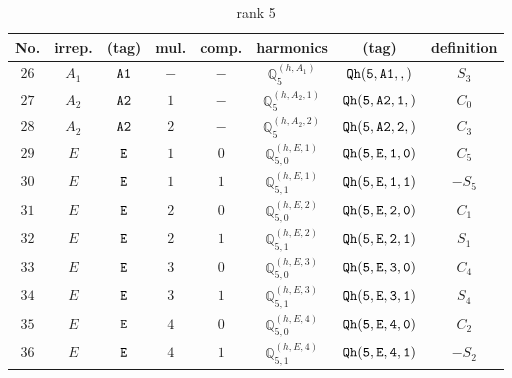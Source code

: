 \documentclass[fleqn,8pt]{jsarticle}
\begin{document}
\begin{table}[ht!]
\begin{center}
\caption{rank 5}
\renewcommand{\arraystretch}{1.3}
\begin{tabular}{cccccccc} \hline \hline
No. & irrep. & (tag) & mul. & comp. & harmonics & (tag) & definition \\ \hline
$ 26 $ & $ A_{1} $ & $ {\tt A1} $ & $ - $ & $ - $ & $ \mathbb{Q}_{5}^{(h,A_{1})} $ & $ {\tt Qh(5,A1,,)} $ & $ S_{3} $ \\
$ 27 $ & $ A_{2} $ & $ {\tt A2} $ & $ 1 $ & $ - $ & $ \mathbb{Q}_{5}^{(h,A_{2},1)} $ & $ {\tt Qh(5,A2,1,)} $ & $ C_{0} $ \\
$ 28 $ & $ A_{2} $ & $ {\tt A2} $ & $ 2 $ & $ - $ & $ \mathbb{Q}_{5}^{(h,A_{2},2)} $ & $ {\tt Qh(5,A2,2,)} $ & $ C_{3} $ \\
$ 29 $ & $ E $ & $ {\tt E} $ & $ 1 $ & $ 0 $ & $ \mathbb{Q}_{5,0}^{(h,E,1)} $ & $ {\tt Qh(5,E,1,0)} $ & $ C_{5} $ \\
$ 30 $ & $ E $ & $ {\tt E} $ & $ 1 $ & $ 1 $ & $ \mathbb{Q}_{5,1}^{(h,E,1)} $ & $ {\tt Qh(5,E,1,1)} $ & $ - S_{5} $ \\
$ 31 $ & $ E $ & $ {\tt E} $ & $ 2 $ & $ 0 $ & $ \mathbb{Q}_{5,0}^{(h,E,2)} $ & $ {\tt Qh(5,E,2,0)} $ & $ C_{1} $ \\
$ 32 $ & $ E $ & $ {\tt E} $ & $ 2 $ & $ 1 $ & $ \mathbb{Q}_{5,1}^{(h,E,2)} $ & $ {\tt Qh(5,E,2,1)} $ & $ S_{1} $ \\
$ 33 $ & $ E $ & $ {\tt E} $ & $ 3 $ & $ 0 $ & $ \mathbb{Q}_{5,0}^{(h,E,3)} $ & $ {\tt Qh(5,E,3,0)} $ & $ C_{4} $ \\
$ 34 $ & $ E $ & $ {\tt E} $ & $ 3 $ & $ 1 $ & $ \mathbb{Q}_{5,1}^{(h,E,3)} $ & $ {\tt Qh(5,E,3,1)} $ & $ S_{4} $ \\
$ 35 $ & $ E $ & $ {\tt E} $ & $ 4 $ & $ 0 $ & $ \mathbb{Q}_{5,0}^{(h,E,4)} $ & $ {\tt Qh(5,E,4,0)} $ & $ C_{2} $ \\
$ 36 $ & $ E $ & $ {\tt E} $ & $ 4 $ & $ 1 $ & $ \mathbb{Q}_{5,1}^{(h,E,4)} $ & $ {\tt Qh(5,E,4,1)} $ & $ - S_{2} $ \\
 \hline \hline
\end{tabular}
\end{center}
\end{table}
\end{document}

